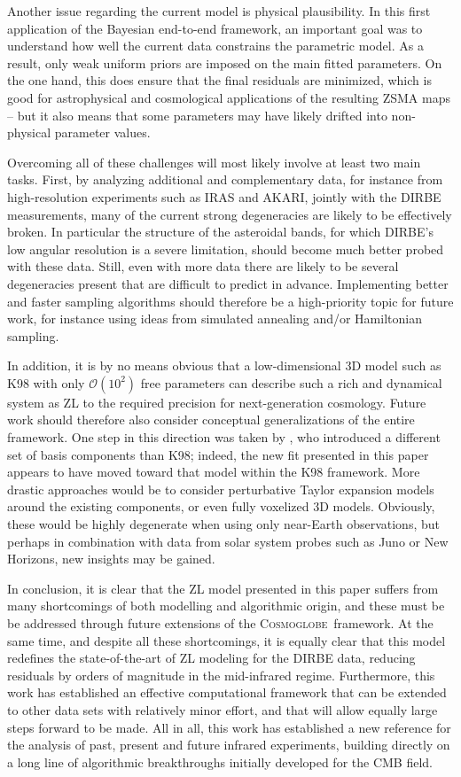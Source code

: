 \documentclass[twocolumn]{aa}
\newcommand{\cosmoglobe}{\textsc{Cosmoglobe}}
\begin{document}
Another issue regarding the current model is physical plausibility. In
this first application of the Bayesian end-to-end framework, an
important goal was to understand how well the current data constrains
the parametric model. As a result, only weak uniform priors are
imposed on the main fitted parameters. On the one hand, this does
ensure that the final residuals are minimized, which is good for
astrophysical and cosmological applications of the resulting ZSMA maps
-- but it also means that some parameters may have likely drifted into
non-physical parameter values.

Overcoming all of these challenges will most likely involve at least
two main tasks. First, by analyzing additional and complementary data,
for instance from high-resolution experiments such as IRAS and AKARI,
jointly with the DIRBE measurements, many of the current strong
degeneracies are likely to be effectively broken. In particular the
structure of the asteroidal bands, for which DIRBE's low angular
resolution is a severe limitation, should become much better probed
with these data. Still, even with more data there are likely to be
several degeneracies present that are difficult to predict in
advance. Implementing better and faster sampling algorithms should
therefore be a high-priority topic for future work, for instance using
ideas from simulated annealing and/or Hamiltonian sampling.

In addition, it is by no means obvious that a low-dimensional 3D model
such as K98 with only $\mathcal{O}(10^2)$ free parameters can describe
such a rich and dynamical system as ZL to the required precision for
next-generation cosmology. Future work should therefore also consider
conceptual generalizations of the entire framework. One step in this
direction was taken by \citet{Robinson2013}, who introduced a
different set of basis components than K98; indeed, the new fit
presented in this paper appears to have moved toward that model within
the K98 framework. More drastic approaches would be to consider
perturbative Taylor expansion models around the existing components,
or even fully voxelized 3D models. Obviously, these would be highly
degenerate when using only near-Earth observations, but perhaps
in combination with data from solar system probes such as Juno or New
Horizons, new insights may be gained.

In conclusion, it is clear that the ZL model presented in this paper
suffers from many shortcomings of both modelling and algorithmic
origin, and these must be be addressed through future extensions of
the \cosmoglobe\ framework. At the same time, and despite all these
shortcomings, it is equally clear that this model redefines the
state-of-the-art of ZL modeling for the DIRBE data, reducing residuals
by orders of magnitude in the mid-infrared regime. Furthermore, this
work has established an effective computational framework that can
be extended to other data sets with relatively minor effort, and that
will allow equally large steps forward to be made. All in all, this
work has established a new reference for the analysis of past, present
and future infrared experiments, building directly on a long line of
algorithmic breakthroughs initially developed for the CMB field.
\end{document}
